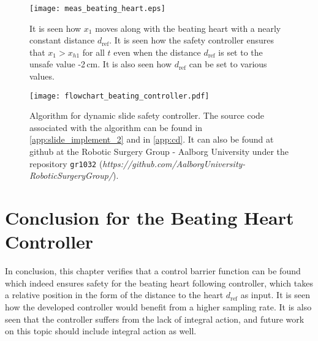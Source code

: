 \begin{figure}[H]
	\center
	\texttt{[image: meas\_beating\_heart.eps]}
	\caption{It is seen how $x_1$ moves along with the beating heart with a nearly constant distance $d_\text{ref}$. It is seen how the safety controller ensures that $x_1 > x_{h1}$ for all $t$ even when the distance $d_\text{ref}$ is set to the unsafe value -2\,cm. It is also seen how $d_\text{ref}$ can be set to various values.}
	\label{fig:beating_heart_meas}
\end{figure}

\begin{figure}[H]
	\center
	\texttt{[image: flowchart\_beating\_controller.pdf]}
	\vspace{2mm}
	\caption{Algorithm for dynamic slide safety controller. The source code associated with the algorithm can be found in \autoref{app:slide_implement_2} and in \autoref{app:cd}. It can also be found at github at the Robotic Surgery Group - Aalborg University under the repository \texttt{gr1032} (\textit{https://github.com/AalborgUniversity-RoboticSurgeryGroup/}).}
	\label{fig:beating_heart_flow}
\end{figure}



\vspace{2mm}
\section{Conclusion for the Beating Heart Controller}
\vspace{-1mm}
In conclusion, this chapter verifies that  a control barrier function can be found which indeed ensures safety for the beating heart following  controller, which takes a relative position in the form of the distance to the heart $d_\text{ref}$ as input. It is seen how the developed controller would benefit from a higher sampling rate. It is also seen that the controller suffers from the lack of integral action, and future work on this topic should include integral action as well. 

